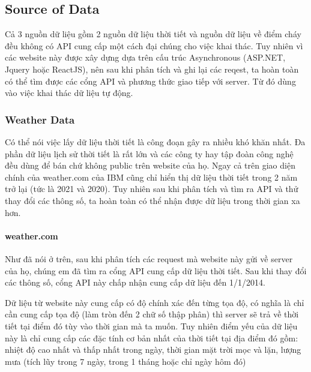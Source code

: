 \documentclass{article}
\begin{document}
\subsection{Source of Data}

\qquad Cả 3 nguồn dữ liệu gồm 2 nguồn dữ liệu thời tiết và nguồn dữ liệu về điểm cháy đều không có API cung cấp một cách đại chúng cho việc khai thác. Tuy nhiên vì các website này được xây dựng dựa trên cấu trúc Asynchronous (ASP.NET, Jquery hoặc ReactJS), nên sau khi phân tích và ghi lại các reqest, ta hoàn toàn có thể tìm được các cổng API và phương thức giao tiếp với server. Từ đó dùng vào việc khai thác dữ liệu tự động.

\subsubsection{Weather Data}

\qquad Có thể nói việc lấy dữ liệu thời tiết là công đoạn gây ra nhiều khó khăn nhất. Đa phần dữ liệu lịch sử thời tiết là rất lớn và các công ty hay tập đoàn công nghệ đều dùng để bán chứ không public trên website của họ. Ngay cả trên giao diện chính của weather.com của IBM cũng chỉ hiển thị dữ liệu thời tiết trong 2 năm trở lại (tức là 2021 và 2020). Tuy nhiên sau khi phân tích và tìm ra API và thử thay đổi các thông số, ta hoàn toàn có thể nhận được dữ liệu trong thời gian xa hơn.

\paragraph{weather.com}
Như đã nói ở trên, sau khi phân tích các request mà website này gửi về server của họ, chúng em đã tìm ra cổng API cung cấp dữ liệu thời tiết. Sau khi thay đổi các thông số, cổng API này chấp nhận cung cấp dữ liệu đến 1/1/2014.

Dữ liệu từ website này cung cấp có độ chính xác đến từng tọa độ, có nghĩa là chỉ cần cung cấp tọa độ (làm tròn đến 2 chữ số thập phân) thì server sẽ trả về thời tiết tại điểm đó tùy vào thời gian mà ta muốn. Tuy nhiên điểm yếu của dữ liệu này là chỉ cung cấp các đặc tính cơ bản nhất của thời tiết tại địa điểm đó gồm: nhiệt độ cao nhất và thấp nhất trong ngày, thời gian mặt trời mọc và lặn, lượng mưa (tích lũy trong 7 ngày, trong 1 tháng hoặc chỉ ngày hôm đó)
\end{document}
